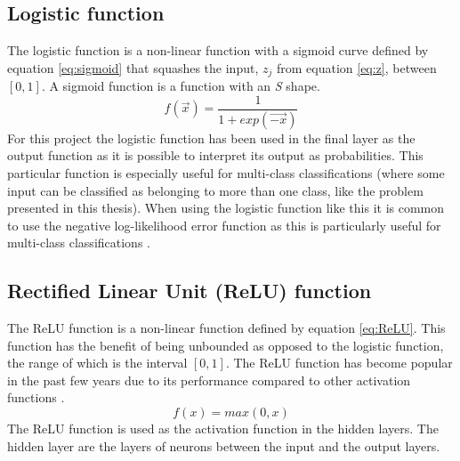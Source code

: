 \subsection{Logistic function}\label{sec:sigmoid_function}
The logistic function is a non-linear function with a sigmoid curve defined by equation \ref{eq:sigmoid} that squashes the input, $z_j$ from equation \ref{eq:z}, between $[0, 1]$. A sigmoid function is a function with an \textit{S} shape.
\begin{equation}\label{eq:sigmoid}
    f(\vec{x})=\frac{1}{1+exp(\vec{-x})}
\end{equation}
For this project the logistic function has been used in the final layer as the output function as it is possible to interpret its output as probabilities. This particular function is especially useful for multi-class classifications (where some input can be classified as belonging to more than one class, like the problem presented in this thesis). When using the logistic function like this it is common to use the negative log-likelihood error function as this is particularly useful for multi-class classifications \parencite{bishop1995neural}.

\subsection{Rectified Linear Unit (ReLU) function}
The ReLU function is a non-linear function defined by equation \ref{eq:ReLU}. This function has the benefit of being unbounded as opposed to the logistic function, the range of which is the interval $[0, 1]$. The ReLU function has become popular in the past few years due to its performance compared to other activation functions \parencite{glorot2011deep}.
\begin{equation}\label{eq:ReLU}
    f(x) = max(0,x)
\end{equation}
The ReLU function is used as the activation function in the hidden layers. The hidden layer are the layers of neurons between the input and the output layers.

